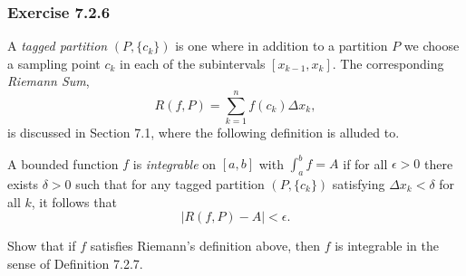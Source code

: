 \subsubsection{Exercise 7.2.6} A \textit{tagged partition} \( (P, \{ c_{k } \} ) \) is one where in addition to a partition \( P  \) we choose a sampling point \( c_{k } \) in each of the subintervals \( [ x_{k-1} , x_{k }]  \). The corresponding \textit{Riemann Sum}, 
\[  R(f, P ) = \sum_{ k=1 }^{ n } f(c_{k }) \Delta x_{k },  \] is discussed in Section 7.1, where the following definition is alluded to. 
\begin{tcolorbox}
	\begin{defn}
	A bounded function \( f  \) is \textit{integrable} on \( [a,b]  \) with \( \int_{ a }^{ b } f = A  \) if for all \( \epsilon > 0   \) there exists \( \delta > 0  \) such that for any tagged partition \( (P, \{ c_{k } \} ) \) satisfying \( \Delta x_{k } < \delta  \) for all \( k  \), it follows that 
	\[  | R(f,P) - A  | < \epsilon. \]
	\end{defn}
\end{tcolorbox}

Show that if \( f  \) satisfies Riemann's definition above, then \( f  \) is integrable in the sense of Definition 7.2.7.

